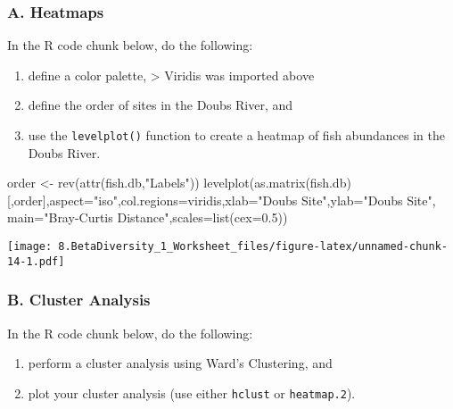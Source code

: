 \documentclass[
]{article}
\newenvironment{Shaded}{\begin{snugshade}}{\end{snugshade}}
\newcommand{\AttributeTok}[1]{\textcolor[rgb]{0.77,0.63,0.00}{#1}}
\newcommand{\FloatTok}[1]{\textcolor[rgb]{0.00,0.00,0.81}{#1}}
\newcommand{\FunctionTok}[1]{\textcolor[rgb]{0.00,0.00,0.00}{#1}}
\newcommand{\NormalTok}[1]{#1}
\newcommand{\OtherTok}[1]{\textcolor[rgb]{0.56,0.35,0.01}{#1}}
\newcommand{\StringTok}[1]{\textcolor[rgb]{0.31,0.60,0.02}{#1}}
\providecommand{\tightlist}{%
  \setlength{\itemsep}{0pt}\setlength{\parskip}{0pt}}
\begin{document}
\hypertarget{a.-heatmaps}{%
\subsubsection{A. Heatmaps}\label{a.-heatmaps}}

In the R code chunk below, do the following:

\begin{enumerate}
\def\labelenumi{\arabic{enumi}.}
\item
  define a color palette, \textgreater{} Viridis was imported above
\item
  define the order of sites in the Doubs River, and
\item
  use the \texttt{levelplot()} function to create a heatmap of fish
  abundances in the Doubs River.
\end{enumerate}

\begin{Shaded}
\begin{Highlighting}[]
\NormalTok{order }\OtherTok{\textless{}{-}} \FunctionTok{rev}\NormalTok{(}\FunctionTok{attr}\NormalTok{(fish.db,}\StringTok{"Labels"}\NormalTok{))}
\FunctionTok{levelplot}\NormalTok{(}\FunctionTok{as.matrix}\NormalTok{(fish.db)[,order],}\AttributeTok{aspect=}\StringTok{"iso"}\NormalTok{,}\AttributeTok{col.regions=}\NormalTok{viridis,}\AttributeTok{xlab=}\StringTok{"Doubs Site"}\NormalTok{,}\AttributeTok{ylab=}\StringTok{"Doubs Site"}\NormalTok{, }\AttributeTok{main=}\StringTok{"Bray{-}Curtis Distance"}\NormalTok{,}\AttributeTok{scales=}\FunctionTok{list}\NormalTok{(}\AttributeTok{cex=}\FloatTok{0.5}\NormalTok{))}
\end{Highlighting}
\end{Shaded}

\texttt{[image: 8.BetaDiversity\_1\_Worksheet\_files/figure-latex/unnamed-chunk-14-1.pdf]}

\hypertarget{b.-cluster-analysis}{%
\subsubsection{B. Cluster Analysis}\label{b.-cluster-analysis}}

In the R code chunk below, do the following:

\begin{enumerate}
\def\labelenumi{\arabic{enumi}.}
\tightlist
\item
  perform a cluster analysis using Ward's Clustering, and
\item
  plot your cluster analysis (use either \texttt{hclust} or
  \texttt{heatmap.2}).
\end{enumerate}
\end{document}
